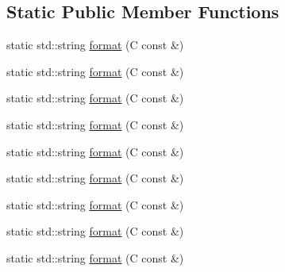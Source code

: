 \subsection*{Static Public Member Functions}
\begin{DoxyCompactItemize}
\item 
static std\+::string \mbox{\hyperlink{structfakeit_1_1Formatter_3_01C_00_01typename_01std_1_1enable__if_3_9is__ostreamable_3_01C_01_4_1_1value_01_4_1_1type_01_4_a4dba58e2321b020a9ac60d5e132afbb0}{format}} (C const \&)
\item 
static std\+::string \mbox{\hyperlink{structfakeit_1_1Formatter_3_01C_00_01typename_01std_1_1enable__if_3_9is__ostreamable_3_01C_01_4_1_1value_01_4_1_1type_01_4_a4dba58e2321b020a9ac60d5e132afbb0}{format}} (C const \&)
\item 
static std\+::string \mbox{\hyperlink{structfakeit_1_1Formatter_3_01C_00_01typename_01std_1_1enable__if_3_9is__ostreamable_3_01C_01_4_1_1value_01_4_1_1type_01_4_a4dba58e2321b020a9ac60d5e132afbb0}{format}} (C const \&)
\item 
static std\+::string \mbox{\hyperlink{structfakeit_1_1Formatter_3_01C_00_01typename_01std_1_1enable__if_3_9is__ostreamable_3_01C_01_4_1_1value_01_4_1_1type_01_4_a4dba58e2321b020a9ac60d5e132afbb0}{format}} (C const \&)
\item 
static std\+::string \mbox{\hyperlink{structfakeit_1_1Formatter_3_01C_00_01typename_01std_1_1enable__if_3_9is__ostreamable_3_01C_01_4_1_1value_01_4_1_1type_01_4_a4dba58e2321b020a9ac60d5e132afbb0}{format}} (C const \&)
\item 
static std\+::string \mbox{\hyperlink{structfakeit_1_1Formatter_3_01C_00_01typename_01std_1_1enable__if_3_9is__ostreamable_3_01C_01_4_1_1value_01_4_1_1type_01_4_a4dba58e2321b020a9ac60d5e132afbb0}{format}} (C const \&)
\item 
static std\+::string \mbox{\hyperlink{structfakeit_1_1Formatter_3_01C_00_01typename_01std_1_1enable__if_3_9is__ostreamable_3_01C_01_4_1_1value_01_4_1_1type_01_4_a4dba58e2321b020a9ac60d5e132afbb0}{format}} (C const \&)
\item 
static std\+::string \mbox{\hyperlink{structfakeit_1_1Formatter_3_01C_00_01typename_01std_1_1enable__if_3_9is__ostreamable_3_01C_01_4_1_1value_01_4_1_1type_01_4_a4dba58e2321b020a9ac60d5e132afbb0}{format}} (C const \&)
\item 
static std\+::string \mbox{\hyperlink{structfakeit_1_1Formatter_3_01C_00_01typename_01std_1_1enable__if_3_9is__ostreamable_3_01C_01_4_1_1value_01_4_1_1type_01_4_a4dba58e2321b020a9ac60d5e132afbb0}{format}} (C const \&)
\end{DoxyCompactItemize}


